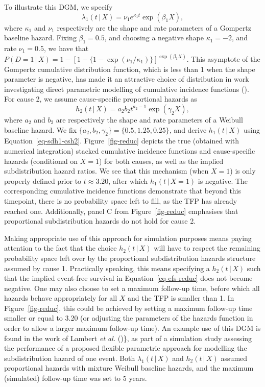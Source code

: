 \documentclass[
  letterpaper,
  paper=240mm:170mm,
  twoside=true,
  open=right,
  fontsize=10pt,
  pagesize=false,
  BCOR=15mm,
  DIV=14,
  headinclude=true,
  footinclude=false,
  headsepline=on]{scrbook}
\newcommand{\given}{\,|\,}
\begin{document}
To illustrate this DGM, we specify \begin{equation*}
    \lambda_1(t \given X) = \nu_1 e^{\kappa_1 t} \exp(\beta_1 X),
\end{equation*} where \(\kappa_1\) and \(\nu_1\) respectively are the
shape and rate parameters of a Gompertz baseline hazard. Fixing
\(\beta_1 = 0.5\), and choosing a negative shape \(\kappa_1 = -2\), and
rate \(\nu_1 = 0.5\), we have that
\(P(D = 1 \given X) = 1 - [1 - \{1 - \exp(\nu_1/\kappa_1)\}]^{\exp(\beta_1 X)}\).
This asymptote of the Gompertz cumulative distribution function, which
is less than 1 when the shape parameter is negative, has made it an
attractive choice of distribution in work investigating direct
parametric modelling of cumulative incidence functions
(). For cause 2, we assume cause-specific proportional hazards as
\begin{equation*}
    h_2(t \given X) = a_2 b_2t^{a_2 - 1} \exp(\gamma_2 X),
\end{equation*} where \(a_2\) and \(b_2\) are respectively the shape and
rate parameters of a Weibull baseline hazard. We fix
\(\{a_2, b_2, \gamma_2\} = \{0.5, 1.25, 0.25\}\), and derive
\(h_1(t \given X)\) using Equation~\ref{eq-sdh1-csh2}.
Figure~\ref{fig-reduc} depicts the true (obtained with numerical
integration) stacked cumulative incidence functions and cause-specific
hazards (conditional on \(X = 1\)) for both causes, as well as the
implied subdistribution hazard ratios. We see that this mechanism (when
\(X = 1\)) is only properly defined prior to \(t \approx 3.20\), after
which \(h_1(t \given X = 1)\) is negative. The corresponding cumulative
incidence functions demonstrate that beyond this timepoint, there is no
probability space left to fill, as the TFP has already reached one.
Additionally, panel C from Figure~\ref{fig-reduc} emphasises that
proportional subdistribution hazards do not hold for cause 2.

Making appropriate use of this approach for simulation purposes means
paying attention to the fact that the choice \(h_2(t \given X)\) will
have to respect the remaining probability space left over by the
proportional subdistribution hazards structure assumed by cause 1.
Practically speaking, this means specifying a \(h_2(t \given X)\) such
that the implied event-free survival in Equation~\ref{eq-efs-reduc} does
not become negative. One may also choose to set a maximum follow-up
time, before which all hazards behave appropriately for all \(X\) and
the TFP is smaller than 1. In Figure~\ref{fig-reduc}, this could be
achieved by setting a maximum follow-up time smaller or equal to 3.20
(or adjusting the parameters of the hazards function in order to allow a
larger maximum follow-up time). An example use of this DGM is found in
the work of Lambert \emph{et al.}
()\}, as part
of a simulation study assessing the performance of a proposed flexible
parametric approach for modelling the subdistribution hazard of one
event. Both \(\lambda_1(t \given X)\) and \(h_2(t \given X)\) assumed
proportional hazards with mixture Weibull baseline hazards, and the
maximum (simulated) follow-up time was set to 5 years.
\end{document}
